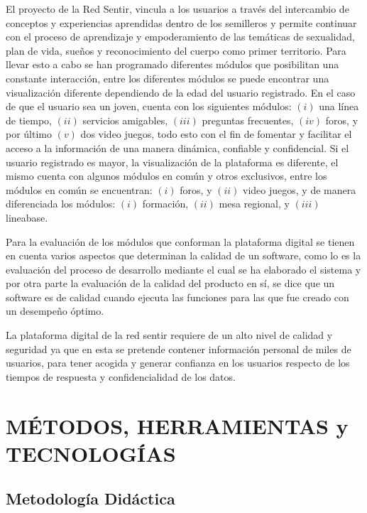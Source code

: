 \documentclass[journal,transmag]{IEEEtran}
\begin{document}
El proyecto de la Red Sentir, vincula a los usuarios a través del intercambio de conceptos y experiencias aprendidas dentro de los semilleros y permite continuar con el proceso de aprendizaje y empoderamiento de las temáticas de sexualidad, plan de vida, sueños y reconocimiento del cuerpo como primer territorio. Para llevar esto a cabo se han programado diferentes módulos que posibilitan una constante interacción, entre los diferentes módulos se puede encontrar una visualización diferente dependiendo de la edad del usuario registrado. 
En el caso de que el usuario sea un joven, cuenta con los siguientes módulos: $(i)$ una línea de tiempo, $(ii)$ servicios amigables, $(iii)$ preguntas frecuentes, $(iv)$ foros, y por último $(v)$ dos video juegos, todo esto con el fin de fomentar y facilitar el acceso a la información de una manera dinámica, confiable y confidencial. Si el usuario registrado es mayor, la visualización de la plataforma es diferente, el mismo cuenta con algunos módulos en común y otros exclusivos, entre los módulos en común se encuentran: $(i)$ foros, y $(ii)$ video juegos, y de manera diferenciada los módulos:  $(i)$ formación, $(ii)$ mesa regional, y $(iii)$ lineabase.

Para la evaluación de los módulos que conforman la plataforma digital se tienen en cuenta varios aspectos que determinan la calidad de un software, como lo es la evaluación del proceso de desarrollo mediante el cual se ha elaborado el sistema y por otra parte la evaluación de la calidad del producto en sí, se dice que un software es de calidad cuando ejecuta las funciones para las que fue creado con un desempeño óptimo.

La plataforma digital de la red sentir requiere de un alto nivel de calidad y seguridad ya que en esta se pretende contener información personal de miles de usuarios, para tener acogida y generar confianza en los usuarios respecto de los tiempos de respuesta y confidencialidad de los datos.

\section{MÉTODOS, HERRAMIENTAS y TECNOLOGÍAS}\label{sec:herramientas}

\subsection{Metodología Didáctica}
\end{document}
